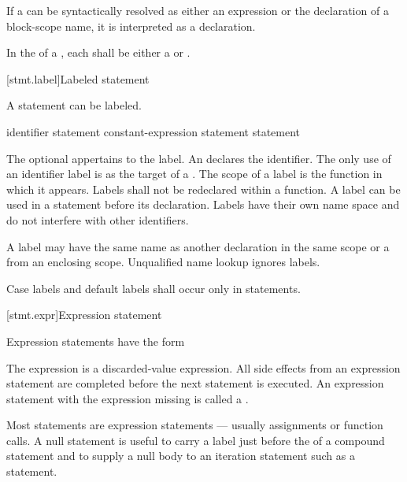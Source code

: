 \pnum
If a  can be syntactically resolved as either an
expression or the declaration of a block-scope name, it is interpreted as a
declaration.

\pnum
In the  of a , each
 shall be either a 
or .

[stmt.label]{Labeled statement}%

\pnum
{}%
%
A statement can be labeled.

\begin{bnf}
\br
     identifier \terminal{:} statement\br
      constant-expression \terminal{:} statement\br
      \terminal{:} statement
\end{bnf}

The optional  appertains to the label. An
 declares the identifier. The only use of an
identifier label is as the target of a
%
.
%
The scope of a label is the function in which it appears. Labels shall
not be redeclared within a function. A label can be used in a
 statement before its declaration.
%
Labels have their own name space and do not interfere with other
identifiers.
\begin{note}
A label may have the same name as another declaration in the same scope or a
 from an enclosing scope. Unqualified name
lookup ignores labels.
\end{note}

\pnum
{}%
%
Case labels and default labels shall occur only in  statements.


[stmt.expr]{Expression statement}%

\pnum
Expression statements have the form
\begin{bnf}
\br
     \terminal{;}
\end{bnf}

The expression is
a discarded-value expression.
All
%
side effects from an expression statement
are completed before the next statement is executed.
%
%
An expression statement with the expression missing is called
a .
\begin{note}
Most statements are expression statements --- usually assignments or
function calls. A null statement is useful to carry a label just before
the \tcode{\}} of a compound statement and to supply a null body to an
iteration statement such as a 
statement.
\end{note}

